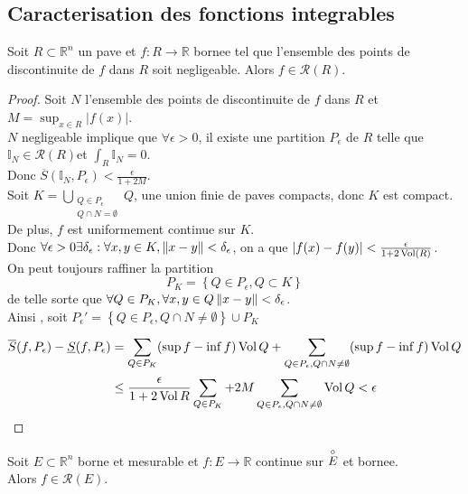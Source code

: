 \documentclass[../main.tex]{subfiles}
\begin{document}
\subsection{Caracterisation des fonctions integrables}
\begin{thm}
	Soit $R \subset \mathbb{R}^n$ un pave et $f : R \to \mathbb{R}$ bornee tel que l'ensemble des points de discontinuite de $f$ dans $R$ soit negligeable. Alors $f \in \mathcal{R}( R) $.
\end{thm}
\begin{proof}
	Soit $N$ l'ensemble des points de discontinuite de $f$ dans $R$ et $M = \sup_{x \in R} | f( x) |$.\\
	$N$ negligeable implique que $\forall \epsilon>0$, il existe une partition $P_\epsilon$ de $R$ telle que $ \mathbb{I}_N \in \mathcal{R}( R) $et $ \int_R \mathbb{I}_N = 0$.\\
	Donc $ \overline{S}(  \mathbb{I}_N, P_\epsilon) < \frac{\epsilon}{1 + 2M} $.\\
	Soit $ K = \bigcup_{\substack{ Q \in P_\epsilon\\Q \cap N = \emptyset }} Q  $, une union finie de paves compacts, donc $K$ est compact.\\
	De plus, $f$ est uniformement continue sur $K$.\\
	Donc $\forall \epsilon>0 \exists \delta_\epsilon: \forall x,y \in K , \left\lVert  x-y\right\rVert < \delta_\epsilon$, on a que $|f( x) -f( y) | < \frac{\epsilon}{1+ 2 \operatorname*{Vol} ( R) }$.\\
	On peut toujours raffiner la partition 
	\[ 
	P_K = \left\{  Q \in P_\epsilon, Q \subset K \right\} 
	\]
	de telle sorte que $\forall Q \in P_K, \forall x,y \in Q \left\lVert x-y\right\rVert < \delta_{\epsilon} $.\\
	Ainsi , soit $P_\epsilon' = \left\{  Q \in P_\epsilon, Q \cap N \neq \emptyset \right\} \cup P_K$
	\begin{align*}
		\overline{S}( f,P_\epsilon) - \underline { S} ( f,P_\epsilon) &= \sum_{Q \in P_K}^{ }( \sup f - \inf f  )\operatorname*{Vol} Q + \sum_{Q \in P_\epsilon, Q \cap N \neq \emptyset}^{ }(  \sup f - \inf f) \operatorname*{Vol} Q\\
			     &\leq \frac{\epsilon}{1 + 2 \operatorname*{Vol} R} \sum_{Q \in P_K}^{ } + 2M 	\sum_{Q \in P_\epsilon, Q \cap N \neq \emptyset} \operatorname*{Vol} Q < \epsilon
	\end{align*}
	
\end{proof}
\begin{crly}
Soit $E \subset \mathbb{R}^n$ borne et mesurable et $f: E \to \mathbb{R} $ continue sur $\overset{\circ}{E}$ et bornee.\\
Alors $f \in \mathcal{R}( E) $.
\end{crly}
\end{document}
